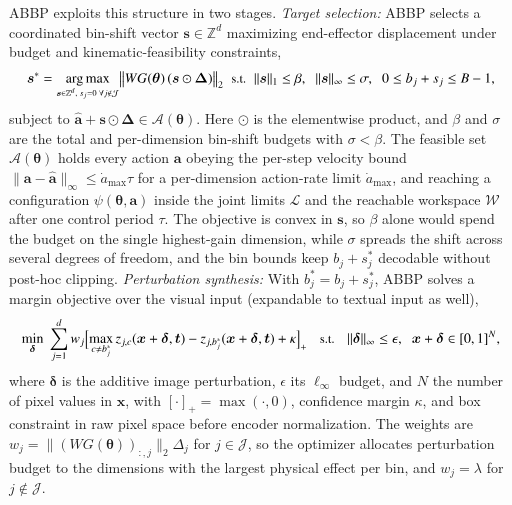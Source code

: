 
ABBP exploits this structure in two stages.
 \emph{Target selection:} ABBP selects a coordinated bin-shift vector $\bm{s}\in\mathbb{Z}^{d}$ maximizing end-effector displacement under budget and kinematic-feasibility constraints,
\vspace{-1ex}\begin{equation}
  \small
\bm{s}^{*}=\argmax_{\substack{\bm{s}\in\mathbb{Z}^{d},\; s_j=0\;\forall j\notin\mathcal{J}}}
\bigl\|W G(\bm{\theta})\,(\bm{s}\odot\bm{\Delta})\bigr\|_{2}
\;\;\text{s.t.}\;\;
\|\bm{s}\|_{1}\le\beta,\;\;
\|\bm{s}\|_{\infty}\le\sigma,\;\;
0\le b_j+s_j\le B-1,
\label{eq:abbp-shift}
\vspace{-1.5ex}\end{equation}
subject to $\hat{\bm{a}}+\bm{s}\odot\bm{\Delta}\in\mathcal{A}(\bm{\theta})$. Here $\odot$ is the
elementwise product, and $\beta$ and $\sigma$ are the total and per-dimension bin-shift budgets with
$\sigma<\beta$. The feasible set $\mathcal{A}(\bm{\theta})$ holds every action $\bm{a}$ obeying the
per-step velocity bound $\|\bm{a}-\hat{\bm{a}}\|_{\infty}\le\dot a_{\max}\tau$ for a per-dimension
action-rate limit $\dot a_{\max}$, and reaching a configuration $\psi(\bm{\theta},\bm{a})$ inside the
joint limits $\mathcal{L}$ and the reachable workspace $\mathcal{W}$ after one control period $\tau$.
The objective is convex in $\bm{s}$, so $\beta$ alone would spend the budget on the single
highest-gain dimension, while $\sigma$ spreads the shift across several degrees of freedom, and the
bin bounds keep $b_j+s_j^{*}$ decodable without post-hoc clipping.
 \emph{Perturbation synthesis:} With $b_j^{*}=b_j+s_j^{*}$, ABBP solves a margin objective over the visual input (expandable to textual input as well),
\vspace{-3ex}\begin{equation}
  \small
\min_{\bm{\delta}}\;\sum_{j=1}^{d} w_j
\Bigl[\max_{c\neq b_j^{*}} z_{j,c}(\bm{x}+\bm{\delta},\bm{t})-z_{j,b_j^{*}}(\bm{x}+\bm{\delta},\bm{t})+\kappa\Bigr]_{+}
\quad\text{s.t.}\quad
\|\bm{\delta}\|_{\infty}\le\epsilon,\;\;\bm{x}+\bm{\delta}\in[0,1]^{N},
\label{eq:abbp-obj}
\vspace{-1.5ex}\end{equation}
where $\bm{\delta}$ is the additive image perturbation, $\epsilon$ its $\ell_{\infty}$ budget, and $N$ the number of pixel values in $\bm{x}$, with $[\cdot]_{+}=\max(\cdot,0)$, confidence margin $\kappa$, and box constraint in raw pixel space before encoder normalization. The weights are $w_j=\|(WG(\bm{\theta}))_{:,j}\|_{2}\Delta_j$ for $j\in\mathcal{J}$, so the optimizer allocates perturbation budget to the dimensions with the largest physical effect per bin, and $w_j=\lambda$ for $j\notin\mathcal{J}$. 
